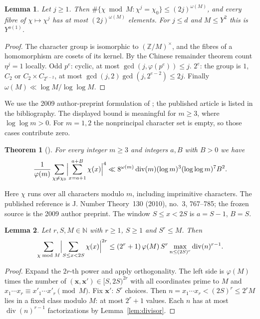 \documentclass{amsart}
\newtheorem{theoremA}{Theorem}
\newtheorem{lemma}{Lemma}[section]
\theoremstyle{definition}
\theoremstyle{plain}
\numberwithin{equation}{section}
\numberwithin{table}{section}
\newcommand{\N}{\mathbb{N}}
\begin{document}
\begin{lemma}\label{lem:mo:kernel}
Let $j\ge1$. Then $\#\{\chi\bmod M:\chi^j=\chi_0\}\le(2j)^{\omega(M)}$, and every
fibre of $\chi\mapsto\chi^j$ has at most $(2j)^{\omega(M)}$ elements. For
$j\le d$ and $M\le Y^2$ this is $Y^{o(1)}$.
\end{lemma}

\begin{proof}
The character group is isomorphic to $(\mathbb Z/M)^\times$, and the fibres of a
homomorphism are cosets of its kernel. By the Chinese remainder theorem count
$\eta^j=1$ locally. Odd $p^e$: cyclic, at most $\gcd(j,\varphi(p^e))\le j$.
$2^e$: the group is $1$, $C_2$ or $C_2\times C_{2^{e-2}}$, at most
$\gcd(j,2)\gcd(j,2^{e-2})\le2j$. Finally
$\omega(M)\ll\log M/\log\log M$.
\end{proof}

We use the 2009 author-preprint formulation of \cite[Theorem~1]{CS}; the
published article is listed in the bibliography. The displayed bound is
meaningful for $m\ge3$, where $\log\log m>0$. For $m=1,2$ the nonprincipal
character set is empty, so those cases contribute zero.

\begin{theoremA}[{\cite[Theorem~1]{CS}}]\label{thm:mo:CS}
For every integer $m\ge3$ and integers $a,B$ with $B>0$ we have
\[
 \frac1{\varphi(m)}\sum_{\chi\ne\chi_0}\Bigl|\sum_{x=a+1}^{a+B}\chi(x)\Bigr|^4
 \ll8^{\omega(m)}\operatorname{div}(m)(\log m)^3(\log\log m)^7B^2.
\]
\end{theoremA}

Here $\chi$ runs over all characters modulo $m$, including imprimitive
characters. The published reference is J. Number Theory~130 (2010), no.~3,
767--785; the frozen source is the 2009 author preprint.
The window $S\le x<2S$ is $a=S-1$, $B=S$.

\begin{lemma}\label{lem:mo:elem}
Let $r,S,M\in\N$ with $r\ge1$, $S\ge1$ and $S^r\le M$. Then
\[
 \sum_{\chi\bmod M}\Bigl|\sum_{S\le x<2S}\chi(x)\Bigr|^{2r}
 \le(2^r+1)\,\varphi(M)\,S^r\max_{n\le(2S)^r}\operatorname{div}(n)^{r-1}.
\]
\end{lemma}

\begin{proof}
Expand the $2r$-th power and apply orthogonality. The left side is
$\varphi(M)$ times the number of $(\mathbf x,\mathbf x')\in[S,2S)^{2r}$ with
all coordinates prime to $M$ and
$x_1\cdots x_r\equiv x'_1\cdots x'_r\pmod M$. Fix $\mathbf x'$: $S^r$ choices.
Then $n=x_1\cdots x_r<(2S)^r\le2^rM$ lies in a fixed class modulo $M$: at most
$2^r+1$ values. Each $n$ has at most $\operatorname{div}(n)^{r-1}$
factorizations by Lemma~\ref{lem:divisor}.
\end{proof}
\end{document}
